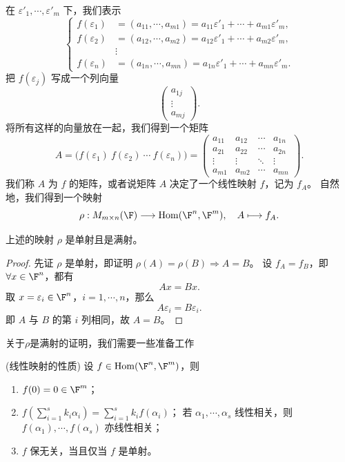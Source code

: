 在 $\varepsilon'_1,\cdots,\varepsilon'_m$ 下，我们表示
\[
\left\{
\begin{aligned}
	f(\varepsilon_1)&=(a_{11},\cdots,a_{m1})
	=a_{11}\varepsilon'_1+\cdots+a_{m1}\varepsilon'_m,\\
	f(\varepsilon_2)&=(a_{12},\cdots,a_{m2})
	=a_{12}\varepsilon'_1+\cdots+a_{m2}\varepsilon'_m,\\
	&\vdots\\
	f(\varepsilon_n)&=(a_{1n},\cdots,a_{mn})
	=a_{1n}\varepsilon'_1+\cdots+a_{mn}\varepsilon'_m.
\end{aligned}
\right.
\]
把 $f(\varepsilon_j)$ 写成一个列向量
\[
\begin{pmatrix}a_{1j}\\\vdots\\a_{mj}\end{pmatrix}.
\]
将所有这样的向量放在一起，我们得到一个矩阵
\[
A=\bigl(f(\varepsilon_1)\ f(\varepsilon_2)\ \cdots\ f(\varepsilon_n)\bigr)
=\begin{pmatrix}
	a_{11}&a_{12}&\cdots&a_{1n}\\
	a_{21}&a_{22}&\cdots&a_{2n}\\
	\vdots&\vdots&\ddots&\vdots\\
	a_{m1}&a_{m2}&\cdots&a_{mn}
\end{pmatrix}.
\]
我们称 $A$ 为 $f$ 的矩阵，或者说矩阵 $A$ 决定了一个线性映射 $f$，记为 $f_A$。
自然地，我们得到一个映射
\[
\rho:M_{m\times n}(\F)\longrightarrow \operatorname{Hom}(\F^n,\F^m),
\quad A\longmapsto f_A.
\]
\begin{proposition}
	上述的映射 $\rho$ 是单射且是满射。
\end{proposition}
\begin{proof}
	先证 $\rho$ 是单射，即证明 $\rho(A)=\rho(B)\Rightarrow A=B$。
	设 $f_A=f_B$，即 $\forall x\in\F^n$，都有
	\[
	Ax=Bx.
	\]
	取 $x=\varepsilon_i\in\F^n$，$i=1,\cdots,n$，那么
	\[
	A\varepsilon_i=B\varepsilon_i.
	\]
	即 $A$ 与 $B$ 的第 $i$ 列相同，故 $A=B$。
\end{proof}
关于$\rho$是满射的证明，我们需要一些准备工作
\begin{proposition}(线性映射的性质)
	设 $f\in\operatorname{Hom}(\F^n,\F^m)$，则
	\begin{enumerate}
		\item $f(0)=0\in\F^m$；
		\item $f\left(\sum_{i=1}^{s}k_i\alpha_i\right)=\sum_{i=1}^{s}k_i f(\alpha_i)$；
		若 $\alpha_1,\cdots,\alpha_s$ 线性相关，则 $f(\alpha_1),\cdots,f(\alpha_s)$ 亦线性相关；
		\item $f$ 保无关，当且仅当 $f$ 是单射。
	\end{enumerate}
\end{proposition}

